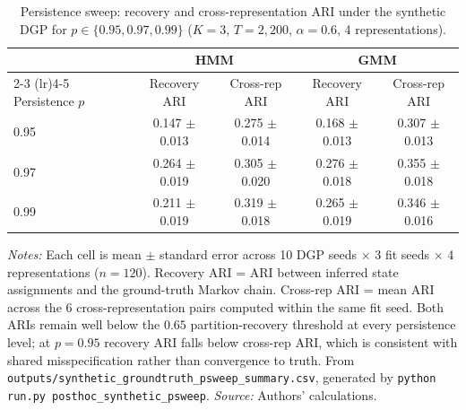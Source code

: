 \documentclass[preprint,12pt,authoryear]{elsarticle}
\begin{document}
\begin{table}[!htbp]
\centering
\small
\setlength{\tabcolsep}{4pt}
\caption{Persistence sweep: recovery and cross-representation ARI under the synthetic DGP for $p \in \{0.95, 0.97, 0.99\}$ ($K=3$, $T=2{,}200$, $\alpha=0.6$, 4 representations).}
\label{tab:synth_psweep}
\begin{tabular}{lcccc}
\toprule
& \multicolumn{2}{c}{HMM} & \multicolumn{2}{c}{GMM} \\
\cmidrule(lr){2-3} \cmidrule(lr){4-5}
Persistence $p$ & Recovery ARI & Cross-rep ARI & Recovery ARI & Cross-rep ARI \\
\midrule
0.95 & 0.147 $\pm$ 0.013 & 0.275 $\pm$ 0.014 & 0.168 $\pm$ 0.013 & 0.307 $\pm$ 0.013 \\
0.97 & 0.264 $\pm$ 0.019 & 0.305 $\pm$ 0.020 & 0.276 $\pm$ 0.018 & 0.355 $\pm$ 0.018 \\
0.99 & 0.211 $\pm$ 0.019 & 0.319 $\pm$ 0.018 & 0.265 $\pm$ 0.019 & 0.346 $\pm$ 0.016 \\
\bottomrule
\end{tabular}
\par\medskip
\footnotesize
\textit{Notes:} Each cell is mean $\pm$ standard error across 10 DGP seeds $\times$ 3 fit seeds $\times$ 4 representations ($n=120$). Recovery ARI = ARI between inferred state assignments and the ground-truth Markov chain. Cross-rep ARI = mean ARI across the 6 cross-representation pairs computed within the same fit seed. Both ARIs remain well below the $0.65$ partition-recovery threshold at every persistence level; at $p=0.95$ recovery ARI falls below cross-rep ARI, which is consistent with shared misspecification rather than convergence to truth. From \texttt{outputs/synthetic\_groundtruth\_psweep\_summary.csv}, generated by \texttt{python run.py posthoc\_synthetic\_psweep}. \textit{Source:} Authors' calculations.
\end{table}
\end{document}
